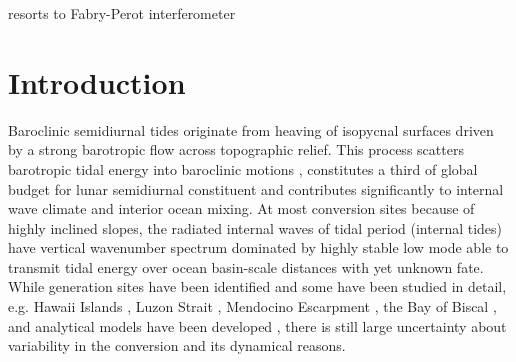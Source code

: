 \documentclass[12pt]{article}
\begin{document}
resorts to Fabry-Perot interferometer
\section{Introduction}
Baroclinic semidiurnal tides originate from heaving of isopycnal surfaces driven by a strong 
barotropic flow across topographic relief. This process scatters barotropic tidal 
energy into baroclinic motions \citep{hendershott1981long}, constitutes a 
third of global budget for lunar semidiurnal constituent \citep{egbert2000significant, 
munk1997once} and contributes significantly to internal wave climate \citep{wunsch1975deep} and 
interior ocean mixing. At most conversion sites because of highly inclined slopes, the radiated 
internal waves of tidal period (internal tides) have vertical wavenumber spectrum dominated by 
highly stable low mode \citep{st2002role} able to transmit tidal energy over ocean basin-scale 
distances \citep{zhao2016global} with yet unknown fate. While generation sites have been identified 
\citep{morozov1995semidiurnal, simmons2004internal, arbic2010concurrent} and some have been 
studied in detail, e.g. Hawaii Islands \citep{rudnick2003tides}, Luzon Strait 
\citep{klymak2011breaking}, Mendocino Escarpment \citep{althaus2003internal}, the Bay of Biscal 
\citep{gerkema2004internal}, and analytical models have been developed \citep{garrett2007internal}, 
there is still large uncertainty about variability in the conversion and its dynamical reasons.\\
\end{document}
